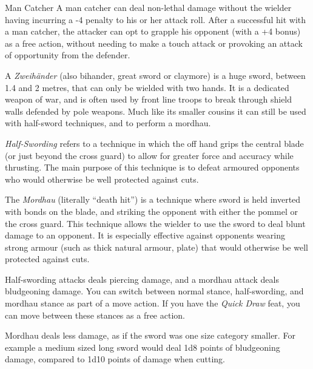 \begin{35e}{Man Catcher}
  A man catcher can deal non-lethal damage without the wielder having
  incurring a -4 penalty to his or her attack roll. After a successful hit
  with a man catcher, the attacker can opt to grapple his opponent (with a +4
  bonus) as a free action, without needing to make a touch attack or provoking
  an attack of opportunity from the defender.
\end{35e}

A \emph{Zweihänder} (also bihander, great sword or claymore) is a huge sword,
between 1.4 and 2 metres, that can only be wielded with two hands. It is a
dedicated weapon of war, and is often used by front line troops to break
through shield walls defended by pole weapons. Much like its smaller cousins
it can still be used with half-sword techniques, and to perform a mordhau.

\emph{Half-Swording} refers to a technique in which the off hand grips the
central blade (or just beyond the cross guard) to allow for greater force and
accuracy while thrusting. The main purpose of this technique is to defeat
armoured opponents who would otherwise be well protected against cuts.

The \emph{Mordhau} (literally ``death hit'') is a technique where sword is
held inverted with bonds on the blade, and striking the opponent with either
the pommel or the cross guard. This technique allows the wielder to use the
sword to deal blunt damage to an opponent. It is especially effective against
opponents wearing strong armour (such as thick natural armour, plate) that
would otherwise be well protected against cuts.

\begin{note}
  Half-swording attacks deals piercing damage, and a mordhau attack deals
  bludgeoning damage. You can switch between normal stance, half-swording, and
  mordhau stance as part of a move action. If you have the \emph{Quick Draw}
  feat, you can move between these stances as a free action.

  Mordhau deals less damage, as if the sword was one size category
  smaller. For example a medium sized long sword would deal 1d8 points of
  bludgeoning damage, compared to 1d10 points of damage when cutting.
\end{note}

